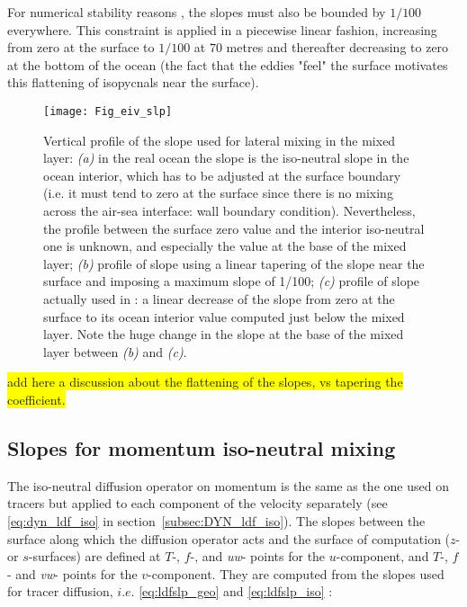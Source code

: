 \documentclass[../main/NEMO_manual]{subfiles}
\begin{document}
For numerical stability reasons \citep{Cox1987, Griffies_Bk04}, the slopes must also be bounded by
$1/100$ everywhere.
This constraint is applied in a piecewise linear fashion, increasing from zero at the surface to
$1/100$ at $70$ metres and thereafter decreasing to zero at the bottom of the ocean
(the fact that the eddies "feel" the surface motivates this flattening of isopycnals near the surface).

\begin{figure}[!ht]
  \begin{center}
    \texttt{[image: Fig\_eiv\_slp]}
    \caption{
      \protect\label{fig:eiv_slp}
      Vertical profile of the slope used for lateral mixing in the mixed layer:
      \textit{(a)} in the real ocean the slope is the iso-neutral slope in the ocean interior,
      which has to be adjusted at the surface boundary
      (i.e. it must tend to zero at the surface since there is no mixing across the air-sea interface:
      wall boundary condition).
      Nevertheless, the profile between the surface zero value and the interior iso-neutral one is unknown,
      and especially the value at the base of the mixed layer;
      \textit{(b)} profile of slope using a linear tapering of the slope near the surface and
      imposing a maximum slope of 1/100;
      \textit{(c)} profile of slope actually used in \NEMO: a linear decrease of the slope from
      zero at the surface to its ocean interior value computed just below the mixed layer.
      Note the huge change in the slope at the base of the mixed layer between \textit{(b)} and \textit{(c)}.
    }
  \end{center}
\end{figure}

\colorbox{yellow}{add here a discussion about the flattening of the slopes, vs tapering the coefficient.}

\subsection{Slopes for momentum iso-neutral mixing}

The iso-neutral diffusion operator on momentum is the same as the one used on tracers but
applied to each component of the velocity separately
(see \autoref{eq:dyn_ldf_iso} in section~\autoref{subsec:DYN_ldf_iso}).
The slopes between the surface along which the diffusion operator acts and the surface of computation
($z$- or $s$-surfaces) are defined at $T$-, $f$-, and \textit{uw}- points for the $u$-component, and $T$-, $f$- and
\textit{vw}- points for the $v$-component.
They are computed from the slopes used for tracer diffusion,
$i.e.$ \autoref{eq:ldfslp_geo} and \autoref{eq:ldfslp_iso} :
\end{document}
